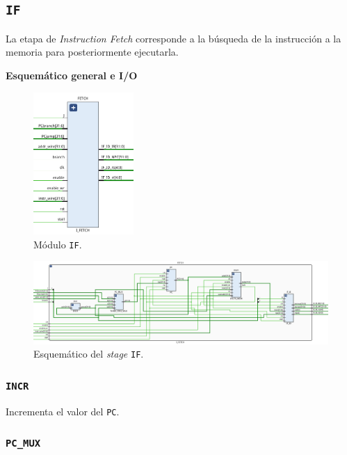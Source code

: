 \documentclass[a4paper]{article}
\begin{document}
\subsection{\texttt{IF}}
La etapa de \textit{Instruction Fetch} corresponde a la búsqueda de la instrucción a la memoria para posteriormente ejecutarla.

\textbf{Esquemático general e I/O}

\begin{figure}[H]
	\begin{center}				
	\includegraphics[width=0.34\textwidth]{IF_2.png}
  	\caption{Módulo \texttt{IF}.}
  	\label{fig:funcionamiento.}
  	\end{center}
\end{figure}

\begin{figure}[H]
	\begin{center}				
	\includegraphics[width=1.4\textwidth,center]{IF.png}
  	\caption{Esquemático del \textit{stage} \texttt{IF}.}
  	\label{fig:funcionamiento.}
  	\end{center}
\end{figure}

\subsubsection{\texttt{INCR}}

Incrementa el valor del \texttt{PC}.

\subsubsection{\texttt{PC\_MUX}}
\end{document}
